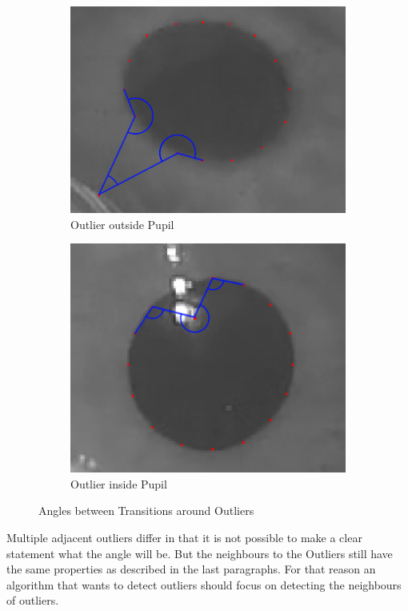 \begin{figure}[H]
\begin{subfigure}{.5\textwidth}
	\centering
	\includegraphics[width=.8\linewidth]{images/angle.png}
	\caption{Outlier outside Pupil}
	\label{fig:outlierOutside}
\end{subfigure}%
\begin{subfigure}{.5\textwidth}
	\centering
	\includegraphics[width=.8\linewidth]{images/outlier_inner.png}
	\caption{Outlier inside Pupil}
	\label{fig:outlierInside}
\end{subfigure}
\caption{Angles between Transitions around Outliers}
\end{figure}

Multiple adjacent outliers differ in that it is not possible to make a clear statement what the angle will be. But the neighbours to the Outliers still have the same properties as described in the last paragraphs. For that reason an algorithm that wants to detect outliers should focus on detecting the neighbours of outliers.

